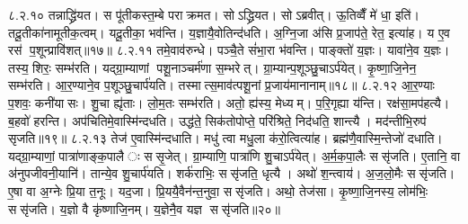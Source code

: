 ८.२.१०
तन्नाद्ध्रि॑यत। स पू॑तीकस्त॒म्बे पराक्रमत। सोऽद्ध्रियत। सोऽब्रवीत्। ऊ॒तिव्वैँ मे॑ धा॒ इति॑। तदू॒तीका॑नामूतीक॒त्वम्। यदू॒तीका॒ भव॑न्ति। य॒ज्ञायै॒वोतिन्द॑धति। अ॒ग्नि॒जा अ॑सि प्र॒जाप॑ते॒ रेत॒ इत्या॑ह। य ए॒व रस॑ प॒शून्प्रावि॑शत्॥१७॥
८.२.११
तमे॒वाव॑रुन्धे। पञ्चै॒ते सं॑भा॒रा भ॑वन्ति। पाङ्क्तो॑ य॒ज्ञः। यावा॑ने॒व य॒ज्ञः। तस्य॒ शिरः॒ सम्भ॑रति। यद्ग्रा॒म्याणां पशू॒नाञ्चर्म॑णा स॒म्भरेत्। ग्रा॒म्यान्प॒शूञ्छु॒चाऽर्प॑येत्। कृ॒ष्णा॒जि॒नेन॒ सम्भ॑रति। आ॒र॒ण्याने॒व प॒शूञ्छु॒चार्प॑यति। तस्मात्स॒माव॑त्पशू॒नां प्र॒जाय॑मानानाम्॥१८॥
८.२.१२
आ॒र॒ण्याः प॒शवः॒ कनी॑यासः। शु॒चा ह्यृ॑ताः। लो॒म॒तः सम्भ॑रति। अतो॒ ह्य॑स्य॒ मेध्यम्। प॒रि॒गृह्या य॑न्ति। रक्ष॑सा॒मप॑हत्यै। ब॒हवो॑ हरन्ति। अप॑चितिमे॒वास्मि॑न्दधति। उद्ध॑ते॒ सिक॑तोपोप्ते॒ परि॑श्रिते॒ निद॑धति॒ शान्त्यै। मद॑न्तीभि॒रुप॑ सृजति॥१९॥
८.२.१३
तेज॑ ए॒वास्मि॑न्दधाति। मधु॑ त्वा मधु॒ला क॑रो॒त्वित्या॑ह। ब्रह्म॑णै॒वास्मि॒न्तेजो॑ दधाति। यद्ग्रा॒म्याणां॒ पात्रा॑णाङ्क॒पालैः ससृ॒जेत्। ग्रा॒म्याणि॒ पात्रा॑णि शु॒चाऽर्प॑येत्। अ॒र्म॒क॒पा॒लैः ससृ॑जति। ए॒तानि॒ वा अ॑नुपजीवनी॒यानि॑। तान्ये॒व शु॒चार्प॑यति। शर्क॑राभिः॒ ससृ॑जति॒ धृत्यै। अथो॑ श॒न्त्वाय॑। अ॒ज॒लो॒मैः ससृ॑जति। ए॒षा वा अ॒ग्नेः प्रि॒या त॒नूः। यद॒जा। प्रि॒ययै॒वैन॑न्त॒नुवा॒ ससृ॑जति। अथो॒ तेज॑सा। कृ॒ष्णा॒जि॒नस्य॒ लोम॑भिः॒ ससृ॑जति। य॒ज्ञो वै कृ॑ष्णाजि॒नम्। य॒ज्ञेनै॒व यज्ञ ससृ॑जति॥२०॥
\anuvakamend

